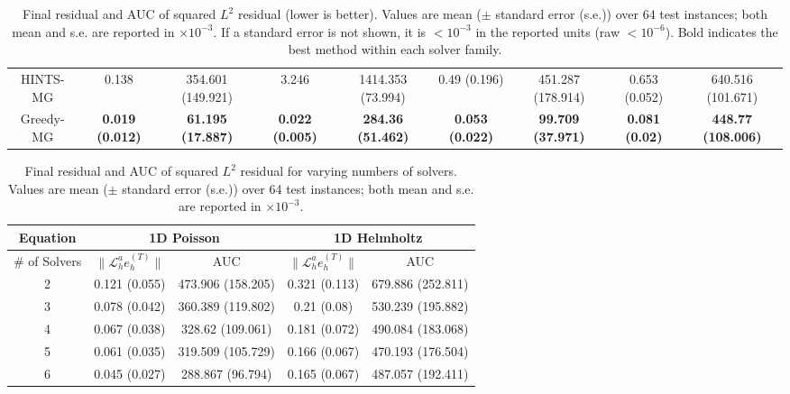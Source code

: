 \documentclass{article} %
\begin{document}
\begin{table}[]
{\begin{tabular}{|c|c|c|c|c|c|c|c|c|}
        HINTS-MG & 0.138 & 354.601 (149.921) & 3.246 & 1414.353 (73.994) & 0.49 (0.196) & 451.287 (178.914) & 0.653 (0.052) & 640.516 (101.671) \\
            Greedy-MG & \textbf{0.019 (0.012)} & \textbf{61.195 (17.887)} & \textbf{0.022 (0.005)} & \textbf{284.36 (51.462)} & \textbf{0.053 (0.022)} & \textbf{99.709 (37.971)} & \textbf{0.081 (0.02)} & \textbf{448.77 (108.006)} \\
         \hline
    \end{tabular}
    }
    \caption{Final residual and AUC of squared $L^2$ residual (lower is better). Values are mean ($\pm$ standard error (s.e.)) over 64 test instances; both mean and s.e. are reported in $\times 10^{-3}$. If a standard error is not shown, it is $< 10^{-3}$ in the reported units (raw $< 10^{-6}$). Bold indicates the best method within each solver family.}
    \label{tab:residualcomparison}
\end{table}
\begin{table}[]
    \centering
    \begin{tabular}{|c|c|c|c|c|}
        \hline
         Equation & \multicolumn{2}{|c|}{1D Poisson} & \multicolumn{2}{|c|}{1D Helmholtz}\\
         \hline 
        \# of Solvers & $\|\mathcal{L}_h^ae^{(T)}_h\|$ & AUC & $\|\mathcal{L}_h^ae^{(T)}_h\|$ & AUC \\
         \hline
        2 & 0.121 (0.055) & 473.906 (158.205) & 0.321 (0.113) & 679.886 (252.811)  \\
        3 & 0.078 (0.042) & 360.389 (119.802) & 0.21 (0.08) & 530.239 (195.882)\\
        4 & 0.067 (0.038) & 328.62 (109.061) & 0.181 (0.072) & 490.084 (183.068)  \\
        5 & 0.061 (0.035) & 319.509 (105.729) & 0.166 (0.067) & 470.193 (176.504) \\
        6 & 0.045 (0.027) & 288.867 (96.794) & 0.165 (0.067) & 487.057 (192.411) \\
         \hline
    \end{tabular}

    \caption{Final residual and AUC of squared $L^2$ residual for varying numbers of solvers. Values are mean ($\pm$ standard error (s.e.)) over 64 test instances; both mean and s.e. are reported in $\times 10^{-3}$.}
    \label{tab:residualcomparison2}
\end{table}
\end{document}
